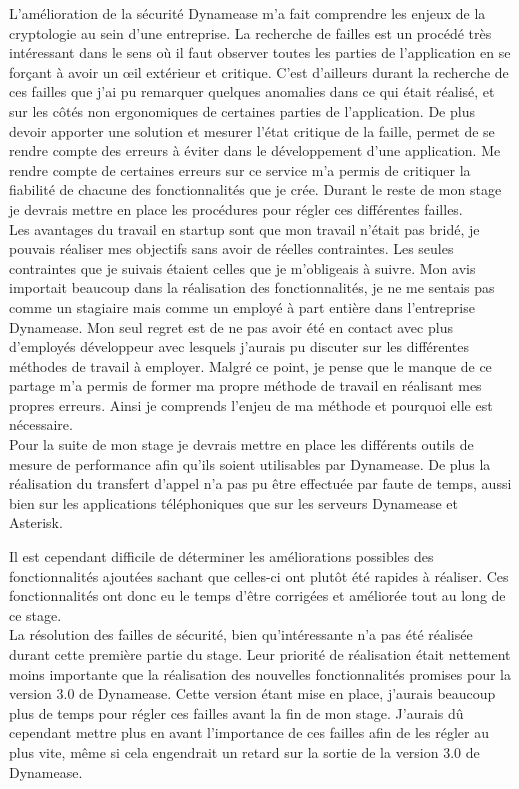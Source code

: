 L'amélioration de la sécurité Dynamease m'a fait comprendre les enjeux de la cryptologie au sein d'une entreprise. La recherche de failles est un procédé très intéressant dans le sens où il faut observer toutes les parties de l'application en se forçant à avoir un œil extérieur et critique. C'est d’ailleurs durant la recherche de ces failles que j'ai pu remarquer quelques anomalies dans ce qui était réalisé, et sur les côtés non ergonomiques de certaines parties de l'application. De plus devoir apporter une solution et mesurer l'état critique de la faille, permet de se rendre compte des erreurs à éviter dans le développement d'une application. Me rendre compte de certaines erreurs sur ce service m'a permis de critiquer la fiabilité de chacune des fonctionnalités que je crée. Durant le reste de mon stage je devrais mettre en place les procédures pour régler ces différentes failles.\\

Les avantages du travail en startup sont que mon travail n'était pas bridé, je pouvais réaliser mes objectifs sans avoir de réelles contraintes. Les seules contraintes que je suivais étaient celles que je m'obligeais à suivre. Mon avis importait beaucoup dans la réalisation des fonctionnalités, je ne me sentais pas comme un stagiaire mais comme un employé à part entière dans l'entreprise Dynamease. Mon seul regret est de ne pas avoir été en contact avec plus d'employés développeur avec lesquels j'aurais pu discuter sur les différentes méthodes de travail à employer. Malgré ce point, je pense que le manque de ce partage m'a permis de former ma propre méthode de travail en réalisant mes propres erreurs. Ainsi je comprends l'enjeu de ma méthode et pourquoi elle est nécessaire.\\

Pour la suite de mon stage je devrais mettre en place les différents outils de mesure de performance afin qu'ils soient utilisables par Dynamease. De plus la réalisation du transfert d'appel n'a pas pu être effectuée par faute de temps, aussi bien sur les applications téléphoniques que sur les serveurs Dynamease et Asterisk.

Il est cependant difficile de déterminer les améliorations possibles des fonctionnalités ajoutées sachant que celles-ci ont plutôt été rapides à réaliser. Ces fonctionnalités ont donc eu le temps d'être corrigées et améliorée tout au long de ce stage.\\

La résolution des failles de sécurité, bien qu’intéressante n'a pas été réalisée durant cette première partie du stage. Leur priorité de réalisation était nettement moins importante que la réalisation des nouvelles fonctionnalités promises pour la version 3.0 de Dynamease. Cette version étant mise en place, j'aurais beaucoup plus de temps pour régler ces failles avant la fin de mon stage. J'aurais dû cependant mettre plus en avant l'importance de ces failles afin de les régler au plus vite, même si cela engendrait un retard sur la sortie de la version 3.0 de Dynamease. 